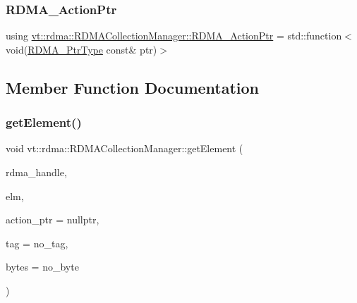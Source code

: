 \subsubsection{\texorpdfstring{R\+D\+M\+A\+\_\+\+Action\+Ptr}{RDMA\_ActionPtr}}
{\footnotesize\ttfamily using \hyperlink{structvt_1_1rdma_1_1_r_d_m_a_collection_manager_a4618a654161e92d2fcc2ab099eba9b65}{vt\+::rdma\+::\+R\+D\+M\+A\+Collection\+Manager\+::\+R\+D\+M\+A\+\_\+\+Action\+Ptr} =  std\+::function$<$void(\hyperlink{namespacevt_aab05b4a584f7ee835a6d0f66915cf59b}{R\+D\+M\+A\+\_\+\+Ptr\+Type} const\& ptr)$>$}



\subsection{Member Function Documentation}
\mbox{\label{structvt_1_1rdma_1_1_r_d_m_a_collection_manager_a3c189a72c3359cf3614c2477e9c1d919}} 
\subsubsection{\texorpdfstring{get\+Element()}{getElement()}}
{\footnotesize\ttfamily void vt\+::rdma\+::\+R\+D\+M\+A\+Collection\+Manager\+::get\+Element (\begin{DoxyParamCaption}\item[{\hyperlink{namespacevt_a10442579ec4e7ebef223818e64bcf908}{R\+D\+M\+A\+\_\+\+Handle\+Type} const \&}]{rdma\+\_\+handle,  }\item[{\hyperlink{namespacevt_a2c2a902092b72056f70210c159f966f0}{R\+D\+M\+A\+\_\+\+Elm\+Type} const \&}]{elm,  }\item[{\hyperlink{namespacevt_1_1rdma_a36020f2b7ae371b6ddc8ec9caffb72d2}{R\+D\+M\+A\+\_\+\+Recv\+Type}}]{action\+\_\+ptr = {\ttfamily nullptr},  }\item[{\hyperlink{namespacevt_a84ab281dae04a52a4b243d6bf62d0e52}{Tag\+Type} const \&}]{tag = {\ttfamily no\+\_\+tag},  }\item[{\hyperlink{namespacevt_aab8d55968084610ce3b17057981e9300}{Byte\+Type} const \&}]{bytes = {\ttfamily no\+\_\+byte} }\end{DoxyParamCaption})\hspace{0.3cm}{\ttfamily [static]}}

